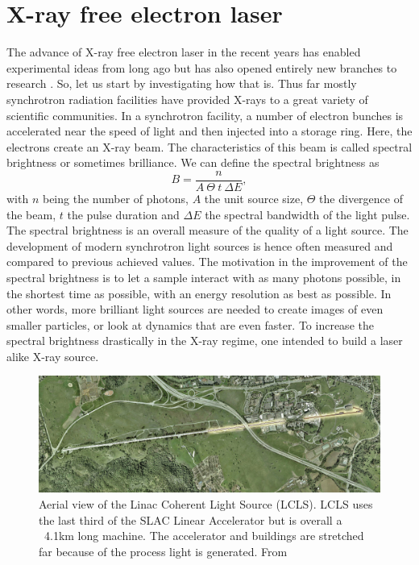 \section{X-ray free electron laser}\label{sec:xfel}
The advance of X-ray free electron laser in the recent years has enabled experimental ideas from long ago but has also opened entirely new branches to research \cite{Pellegrini-2016-RMP,Bostedt-2016-RMP}. So, let us start by investigating how that is. Thus far mostly synchrotron radiation facilities have provided X-rays to a great variety of scientific communities. In a synchrotron facility, a number of electron bunches is accelerated near the speed of light and then injected into a storage ring. Here, the electrons create an X-ray beam. The characteristics of this beam is called spectral brightness \cite{Mills-2005-IUCR} or sometimes brilliance. We can define the spectral brightness as \cite{Als-Nielson-2011-JWS}
\begin{equation}
B = \frac{n}{A\ \Theta\ t\ \Delta\! E},
\label{eq:spectral-brightness}
\end{equation}
with $n$ being the number of photons, $A$ the unit source size, $\Theta$ the divergence of the beam, $t$ the pulse duration and $\Delta\! E$ the spectral bandwidth of the light pulse. The spectral brightness is an overall measure of the quality of a light source. The development of modern synchrotron light sources is hence often measured and compared to previous achieved values. The motivation in the improvement of the spectral brightness is to let a sample interact with as many photons possible, in the shortest time as possible, with an energy resolution as best as possible. In other words, more brilliant light sources are needed to create images of even smaller particles, or look at dynamics that are even faster. To increase the spectral brightness drastically in the X-ray regime, one intended to build a laser alike X-ray source. 
\begin{figure}[t]
	\centering
		\includegraphics[width=1.00\textwidth]{images/aerial-view-lcls.jpg}
	\caption[Aerial view of the Linac Coherent Light Source.]{Aerial view of the Linac Coherent Light Source (LCLS). LCLS uses the last third of the SLAC Linear Accelerator but is overall a ~4.1km long machine. The accelerator and buildings are stretched far because of the process light is generated. From \cite{SLAC-2009-Flickr}}
	\label{fig:aerial-view-lcls}
\end{figure}
